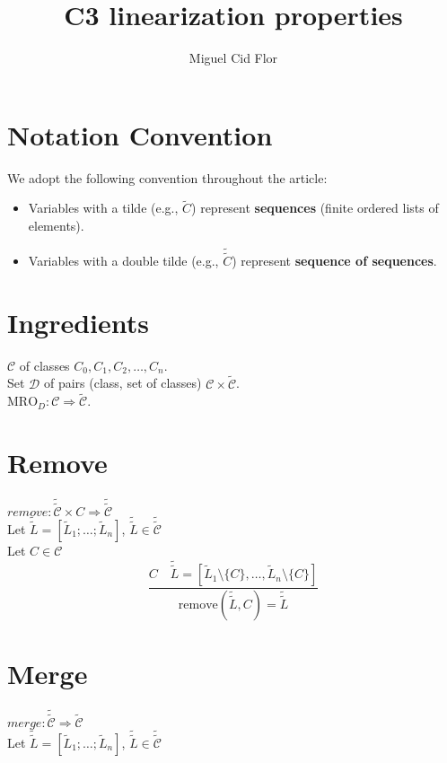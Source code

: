\documentclass{article}
\author{Miguel Cid Flor}
\title{C3 linearization properties}
\begin{document}
\maketitle
\section*{Notation Convention}

We adopt the following convention throughout the article:

\begin{itemize}
    \item Variables with a tilde (e.g.,  $\tilde{C}$) represent \textbf{sequences} (finite ordered lists of elements).
    \item Variables with a double tilde (e.g.,  $\tilde{\tilde{C}}$) represent \textbf{sequence of sequences}.
\end{itemize}

\section*{Ingredients}

$\mathcal{C}$ of classes $C_0, C_1, C_2, \ldots, C_n$.\\
Set $\mathcal{D}$ of pairs (class, set of classes) $\mathcal{C} \times \mathcal{\tilde{C}}$.\\
$\text{MRO}_D : \mathcal{C} \Rightarrow \mathcal{\tilde{C}}$.



\section*{Remove}
$remove : \mathcal{\tilde{\tilde{C}}} \times C \Rightarrow \mathcal{\tilde{\tilde{C}}}$\\
Let $\tilde{\tilde{L}} = [\tilde{L}_1; \ldots ; \tilde{L}_n]$, $\tilde{\tilde{L}} \in \mathcal{\tilde{\tilde{C}}}$\\
Let $C \in \mathcal{C}$\\

\[
\frac{
  C \quad \tilde{\tilde{L}} = [\tilde{L}_1 \setminus \{C\}, \dots, \tilde{L}_n \setminus \{C\}]
}{
  \text{remove}(\tilde{\tilde{L}}, C) = \tilde{\tilde{L}}
}
\]

\vspace{2cm}
\section*{Merge}
$merge : \mathcal{\tilde{\tilde{C}}} \Rightarrow \tilde{\mathcal{C}} $ \\
Let $\tilde{\tilde{L}} = [\tilde{L}_1; \ldots ; \tilde{L}_n]$, $\tilde{\tilde{L}} \in \mathcal{\tilde{\tilde{C}}}$\\
\end{document}
